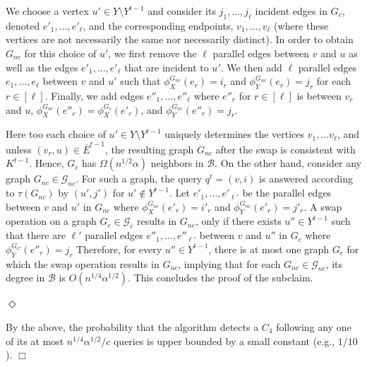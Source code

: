\documentclass{article}
\newcommand{\calB}{{\mathcal{B}}}
\newcommand{\calG}{{\mathcal{G}}}
\newenvironment{proof}{\smallskip\noindent{\bf Proof:}}%
        {\hspace*{\fill}$\Box$\par}
\newcommand{\commentt}[1]{ {}}
\begin{document}
\begin{proof}
 We choose a vertex $u'\in Y\setminus Y^{t-1}$  and consider its $j_1,\dots,j_\ell$ incident edges in $G_c$, denoted $e'_1,\dots,e'_\ell$, and the corresponding endpoints,
$v_1, \ldots, v_{\ell}$ (where these vertices are not necessarily the same nor necessarily distinct).
 In order to obtain $G_{nc}$ for this choice of $u'$, we first remove the $\ell$ parallel edges between $v$ and $u$ as well as the edges %
 $e'_1,\dots,e'_\ell$ that are incident to $u'$.
 We then  add $\ell$ parallel edges $e_1,\dots,e_\ell$ between $v$ and $u'$
 such that $\phi^{G_{nc}}_X(e_r)= i_r$ and $\phi^{G_{nc}}_Y(e_r)= j_r$ for each $r \in [\ell]$. Finally, we  add edges $e''_1,\dots,e''_\ell$ where $e''_r$ for $r\in [\ell]$ is between $v_{r}$ and $u$, $\phi^{G_{nc}}_X(e''_r) = \phi^{G_c}_X(e'_r)$, and $\phi^{G_{nc}}_Y(e''_r) = j_r$.


  Here too each choice of $u'\in Y\setminus Y^{t-1}$ uniquely determines the vertices $v_1, \ldots v_{\ell}$, and unless $(v_{r},u)\in \overline{E}^{t-1}$, the resulting graph $G_{nc}$ after the swap is consistent with $K^{t-1}$. Hence,  $G_c$ has $\Omega(n^{1/2}\alpha)$ neighbors in $\calB$.
   \commentt{DR: I have to finish from here on, but am a bit unsure about the last statement because of the constraint on non-edges and the possibility of high-multiplicity}
    On the other hand,  consider any graph $G_{nc} \in \calG_{nc}$.
    For such a graph, the query $q^t = (v,i)$ is answered according to $\tau(G_{nc})$ by $(u',j')$ for $u' \notin Y^{t-1}$.
    Let $e'_1,\dots,e'_{\ell'}$ be the parallel edges between $v$
    and $u'$ in $G_{nc}$ where $\phi^{G_{nc}}_X(e'_r)=i'_r$ and
    $\phi^{G_{nc}}_Y(e'_r)=j'_r$.
    A swap operation on a graph $G_{c} \in \calG_c$ results in $G_{nc}$, only if there exists $u''\in Y^{t-1}$ such that
    there are $\ell'$ parallel edges $e''_1,\dots,e''_{\ell'}$ between $v$ and $u''$ in $G_c$ where $\phi^{G_C}_Y(e''_r)=j_r$
    Therefore, for every  $u''\in Y^{t-1}$, there  is at most  one graph $G_c$ for which the swap operation results in $G_{nc}$, implying that for each $G_{nc}\in \calG_{nc}$, its degree in $\calB$ is $O(n^{1/4}\alpha^{1/2})$. This concludes the proof of the subclaim.
\fi
  {\hspace*{\fill}$\Diamond$\par}

\smallskip
By the above, the probability that the algorithm detects a $C_4$ following any one of its at most
$n^{1/4}\alpha^{1/2}/c$ queries is upper bounded by a small constant (e.g., $1/10$).
\end{proof}
\end{document}
